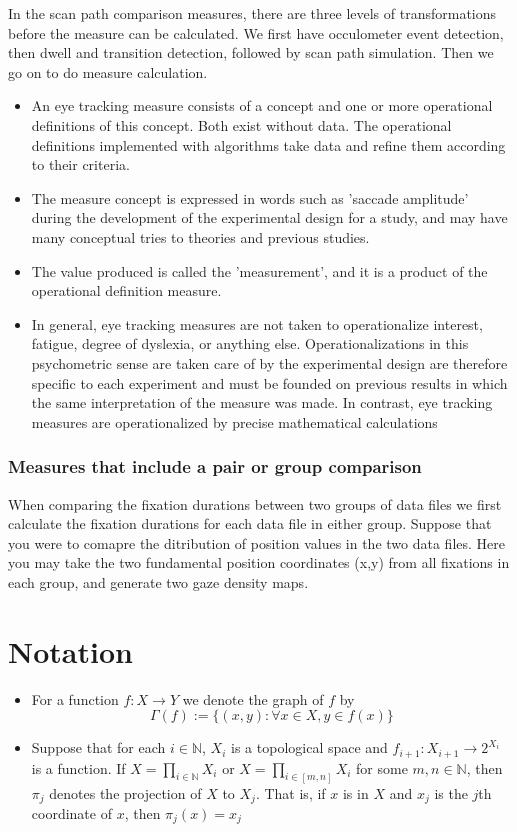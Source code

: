 \documentclass[12pt]{article}
\theoremstyle{definition}
\begin{document}
In the scan path comparison measures, there are three levels of transformations before the measure can be calculated. We first have occulometer event detection, then dwell and transition detection, followed by scan path simulation. Then we go on to do measure calculation.

\begin{itemize}
\item An eye tracking measure consists of a concept and one or more operational definitions of this concept. Both exist without data. The operational definitions implemented with algorithms take data and refine them according to their criteria. 

\item The measure concept is expressed in words such as 'saccade amplitude' during the development of the experimental design for a study, and may have many conceptual tries to theories and previous studies.

\item The value produced is called the 'measurement', and it is a product of the operational definition measure.

\item In general, eye tracking measures are not taken to operationalize interest, fatigue, degree of dyslexia, or anything else. Operationalizations in this psychometric sense are taken care of by the experimental design are therefore specific to each experiment and must be founded on previous results in which the same interpretation of the measure was made. In contrast, eye tracking measures are operationalized by precise mathematical calculations
\end{itemize}

\subsubsection{Measures that include a pair or group comparison}
When comparing the fixation durations between two groups of data files we first calculate the fixation durations for each data file in either group. Suppose that you were to comapre the ditribution of position values in the two data files. Here you may take the two fundamental position coordinates (x,y) from all fixations in each group, and generate two gaze density maps. 

\newpage
\section{Notation}
\begin{itemize}
\item For a function $f: X \to Y$ we denote the graph of $f$ by
\[ \Gamma(f) := \lbrace (x,y) : \forall x \in X, y \in f(x) \rbrace \]

\item Suppose that for each $i \in \mathbb{N}$, $X_i$ is a topological space and $f_{i+1}: X_{i+1} \to 2^{X_i}$ is a function. If $X = \prod _{i \in \mathbb{N}} X_i$ or $X = \prod _{i \in [m,n]} X_i$ for some $m, n \in \mathbb{N}$, then $\pi_j$ denotes the projection of $X$ to $X_j$. That is, if $x$ is in $X$ and $x_j$ is the $j$th coordinate of $x$, then $\pi_j(x) = x_j$

\end{itemize}
\end{document}
